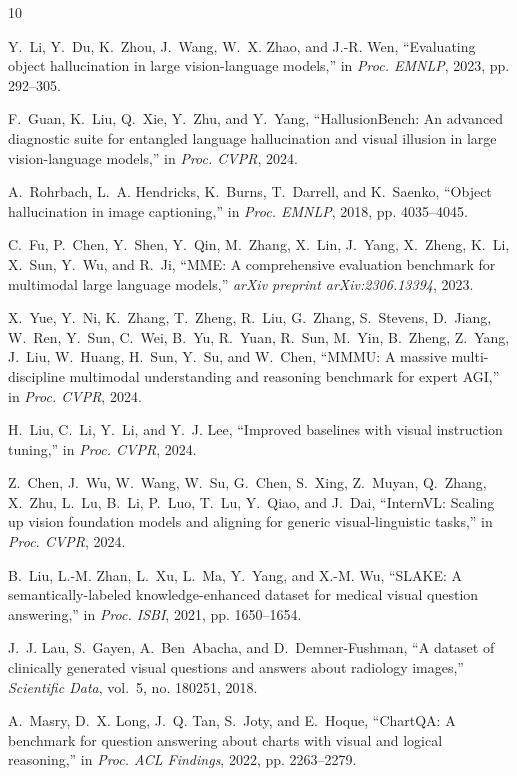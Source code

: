 \documentclass[conference]{IEEEtran}
\begin{document}
\begin{thebibliography}{10}

Y.~Li, Y.~Du, K.~Zhou, J.~Wang, W.~X. Zhao, and J.-R. Wen, ``Evaluating object hallucination in large vision-language models,'' in \textit{Proc. EMNLP}, 2023, pp. 292--305.

F.~Guan, K.~Liu, Q.~Xie, Y.~Zhu, and Y.~Yang, ``HallusionBench: An advanced diagnostic suite for entangled language hallucination and visual illusion in large vision-language models,'' in \textit{Proc. CVPR}, 2024.

A.~Rohrbach, L.~A. Hendricks, K.~Burns, T.~Darrell, and K.~Saenko, ``Object hallucination in image captioning,'' in \textit{Proc. EMNLP}, 2018, pp. 4035--4045.

C.~Fu, P.~Chen, Y.~Shen, Y.~Qin, M.~Zhang, X.~Lin, J.~Yang, X.~Zheng, K.~Li, X.~Sun, Y.~Wu, and R.~Ji, ``MME: A comprehensive evaluation benchmark for multimodal large language models,'' \textit{arXiv preprint arXiv:2306.13394}, 2023.

X.~Yue, Y.~Ni, K.~Zhang, T.~Zheng, R.~Liu, G.~Zhang, S.~Stevens, D.~Jiang, W.~Ren, Y.~Sun, C.~Wei, B.~Yu, R.~Yuan, R.~Sun, M.~Yin, B.~Zheng, Z.~Yang, J.~Liu, W.~Huang, H.~Sun, Y.~Su, and W.~Chen, ``MMMU: A massive multi-discipline multimodal understanding and reasoning benchmark for expert AGI,'' in \textit{Proc. CVPR}, 2024.

H.~Liu, C.~Li, Y.~Li, and Y.~J. Lee, ``Improved baselines with visual instruction tuning,'' in \textit{Proc. CVPR}, 2024.

Z.~Chen, J.~Wu, W.~Wang, W.~Su, G.~Chen, S.~Xing, Z.~Muyan, Q.~Zhang, X.~Zhu, L.~Lu, B.~Li, P.~Luo, T.~Lu, Y.~Qiao, and J.~Dai, ``InternVL: Scaling up vision foundation models and aligning for generic visual-linguistic tasks,'' in \textit{Proc. CVPR}, 2024.

B.~Liu, L.-M. Zhan, L.~Xu, L.~Ma, Y.~Yang, and X.-M. Wu, ``SLAKE: A semantically-labeled knowledge-enhanced dataset for medical visual question answering,'' in \textit{Proc. ISBI}, 2021, pp. 1650--1654.

J.~J. Lau, S.~Gayen, A.~Ben~Abacha, and D.~Demner-Fushman, ``A dataset of clinically generated visual questions and answers about radiology images,'' \textit{Scientific Data}, vol.~5, no. 180251, 2018.

A.~Masry, D.~X. Long, J.~Q. Tan, S.~Joty, and E.~Hoque, ``ChartQA: A benchmark for question answering about charts with visual and logical reasoning,'' in \textit{Proc. ACL Findings}, 2022, pp. 2263--2279.

\end{thebibliography}
\end{document}
